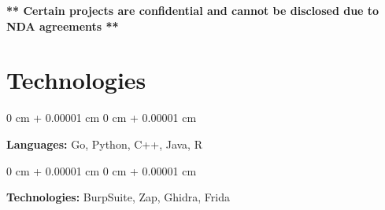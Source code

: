 \documentclass[10pt, letterpaper]{article}
\newenvironment{onecolentry}{
    \begin{adjustwidth}{
        0 cm + 0.00001 cm
    }{
        0 cm + 0.00001 cm
    }
}{
    \end{adjustwidth}
} %
\begin{document}
		\vspace{0.5cm}
		\noindent \textbf{** Certain projects are confidential and cannot be disclosed due to NDA agreements **}
		
    
    \section{Technologies}


 \vspace{0.35 cm}
        
        \begin{onecolentry}
            \textbf{Languages:} Go, Python, C++, Java, R
        \end{onecolentry}

        \vspace{0.2 cm}

        \begin{onecolentry}
            \textbf{Technologies:} BurpSuite, Zap, Ghidra, Frida
        \end{onecolentry}


    
\end{document}
